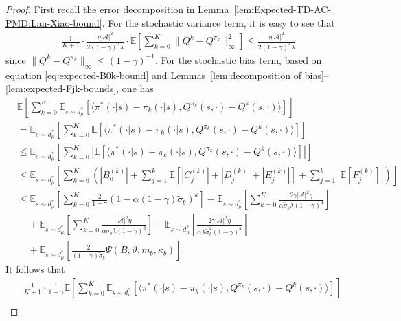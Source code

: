 \documentclass[10pt]{article}
\newcommand{\calA}{\mathcal{A}}
\newcommand{\E}{\mathbb{E}}
\newcommand{\ls}{\left}
\newcommand{\rs}{\right}
\theoremstyle{plain}
\theoremstyle{definition}
\begin{document}
\begin{proof}
First recall the error decomposition in Lemma~\ref{lem:Expected-TD-AC-PMD:Lan-Xiao-bound}. 
For the stochastic variance term, it is easy to see that 
\begin{align*}
    \frac{1}{K+1} \cdot \frac{\eta |\calA|^2}{2(1-\gamma)^2\lambda} \cdot \E\ls[ \sum_{k=0}^K \| Q^{k} - Q^{\pi_k} \|_\infty^2 \rs] \leq \frac{\eta|\calA|^2}{2(1-\gamma)^4 \lambda}
\end{align*}
since $\| Q^k - Q^{\pi_k} \|_\infty \leq (1-\gamma)^{-1}$. For the stochastic bias term, based on equation \eqref{eq:expected-B0k-bound} and Lemmas~\ref{lem:decomposition of bias}--\ref{lem:expected-Fjk-bounds}, one has 
\begin{align*}
    &\mathbb{E}\left[\sum_{k=0}^K\mathbb{E}_{s\sim d_\mu^*}[\langle \pi^*(\cdot|s)-\pi_k(\cdot|s),Q^{\pi_k}(s,\cdot)-Q^{k}(s,\cdot)\rangle]\right]\\
    &=\mathbb{E}_{s\sim d_\mu^*}\left[\sum_{k=0}^K\mathbb{E}[\langle \pi^*(\cdot|s)-\pi_k(\cdot|s),Q^{\pi_k}(s,\cdot)-Q^{k}(s,\cdot)\rangle]\right]\\
    &\leq \mathbb{E}_{s\sim d_\mu^*}\left[\sum_{k=0}^K\left|\mathbb{E}[\langle \pi^*(\cdot|s)-\pi_k(\cdot|s),Q^{\pi_k}(s,\cdot)-Q^{k}(s,\cdot)\rangle]\right|\right]\\
    &\leq \mathbb{E}_{s\sim d_\mu^*}\left[\sum_{k=0}^K\left(\ls|B_0^{(k)}\rs|+\sum_{j=1}^k\mathbb{E}[\ls|C_j^{(k)}\rs|+\ls|D_j^{(k)}\rs|+\ls|E_j^{(k)}\rs|]+\sum_{j=1}^k\ls|\mathbb{E}\ls[F_j^{(k)}\rs]\rs|\right)\right]\\
    &\leq \mathbb{E}_{s\sim d_\mu^*}\left[\sum_{k=0}^K \frac{2}{1-\gamma}(1-\alpha(1-\gamma)\tilde{\sigma}_b)^k\right]+\mathbb{E}_{s\sim d_\mu^*}\left[\sum_{k=0}^K\frac{2\gamma |\mathcal{A}|^2\eta}{\alpha\tilde{\sigma}_b\lambda(1-\gamma)^4}\right]\\
    &\;\;\;\;+\mathbb{E}_{s\sim d_\mu^*}\left[\sum_{k=0}^K\frac{|\mathcal{A}|^2\eta}{\alpha\tilde{\sigma}_b\lambda(1-\gamma)^3}\right]+\mathbb{E}_{s\sim d_\mu^*}\left[\frac{2\gamma|\mathcal{A}|^2\eta}{\alpha\lambda\tilde{\sigma}_b^2(1-\gamma)^4}\right]\\
    &\;\;\;\;+\mathbb{E}_{s\sim d_\mu^*}\left[\frac{2}{(1-\gamma)\tilde{\sigma}_b}\Psi({B},\vartheta,m_b,\kappa_b)\right].
\end{align*}
It follows that 
\begin{align*}
    &\frac{1}{K+1}\cdot\frac{1}{1-\gamma}\mathbb{E}\left[\sum_{k=0}^K\mathbb{E}_{s\sim d_\mu^*}[\langle \pi^*(\cdot|s)-\pi_k(\cdot|s),Q^{\pi_k}(s,\cdot)-Q^{k}(s,\cdot)\rangle]\right]\\

\end{align*}
\end{proof}
\end{document}
